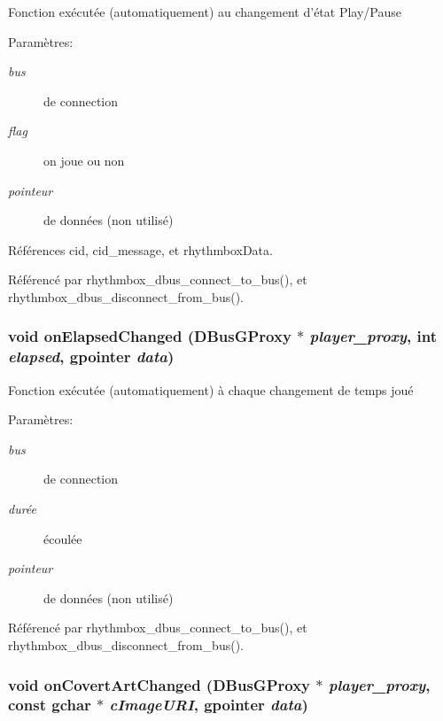 Fonction exécutée (automatiquement) au changement d'état Play/Pause \begin{Desc}
\item[Paramètres:]
\begin{description}
\item[{\em bus}]de connection \item[{\em flag}]on joue ou non \item[{\em pointeur}]de données (non utilisé) \end{description}
\end{Desc}


Références cid, cid\_\-message, et rhythmboxData.

Référencé par rhythmbox\_\-dbus\_\-connect\_\-to\_\-bus(), et rhythmbox\_\-dbus\_\-disconnect\_\-from\_\-bus().
\subsubsection{\setlength{\rightskip}{0pt plus 5cm}void onElapsedChanged (DBusGProxy $\ast$ {\em player\_\-proxy}, \/  int {\em elapsed}, \/  gpointer {\em data})}\label{cid-rhythmbox_8h_a7d662176f9bcfad02d1f3f7369cf3de}


Fonction exécutée (automatiquement) à chaque changement de temps joué \begin{Desc}
\item[Paramètres:]
\begin{description}
\item[{\em bus}]de connection \item[{\em durée}]écoulée \item[{\em pointeur}]de données (non utilisé) \end{description}
\end{Desc}


Référencé par rhythmbox\_\-dbus\_\-connect\_\-to\_\-bus(), et rhythmbox\_\-dbus\_\-disconnect\_\-from\_\-bus().
\subsubsection{\setlength{\rightskip}{0pt plus 5cm}void onCovertArtChanged (DBusGProxy $\ast$ {\em player\_\-proxy}, \/  const gchar $\ast$ {\em cImageURI}, \/  gpointer {\em data})}\label{cid-rhythmbox_8h_7af9b89f4f0b3abc7ec452aa3c10797b}



